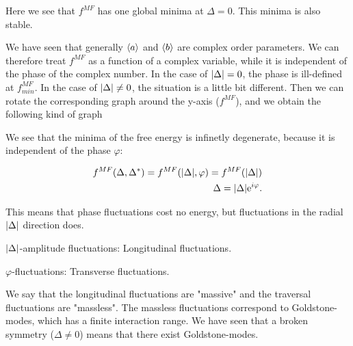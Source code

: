 
Here we see that $f^{MF}$ has one global minima at $\Delta = 0$. This minima is also stable. 

We have seen that generally $\expval{a}$ and $\expval{b}$ are complex order parameters. We can therefore treat $f^{MF}$ as a function of a complex variable, while it is independent of the phase of the complex number. In the case of $\abs{\Delta} = 0$, the phase is ill-defined at $f^{MF}_{min}$. In the case of $\abs{\Delta} \neq 0$, the situation is a little bit different. Then we can rotate the corresponding graph around the y-axis ($f^{MF}$), and we obtain the following kind of graph

%     


We see that the minima of the free energy is infinetly degenerate, because it is independent of the phase $\varphi$: 

\begin{align*}
    f^{MF}(\Delta, \Delta^*) = f^{MF}(\abs{\Delta}, \varphi) = f^{MF}(\abs{\Delta}) \\
    \Delta = \abs{\Delta}\mathrm{e}^{i\varphi}. 
\end{align*}

This means that phase fluctuations cost no energy, but fluctuations in the radial $\abs{\Delta}$ direction does. \

$\abs{\Delta}$-amplitude fluctuations: Longitudinal fluctuations. 

$\varphi$-fluctuations: Transverse fluctuations. 

We say that the longitudinal fluctuations are "massive" and the traversal fluctuations are "massless". The massless fluctuations correspond to Goldstone-modes, which has a finite interaction range. We have seen that a broken symmetry ($\Delta \neq 0$) means that there exist Goldstone-modes. 

